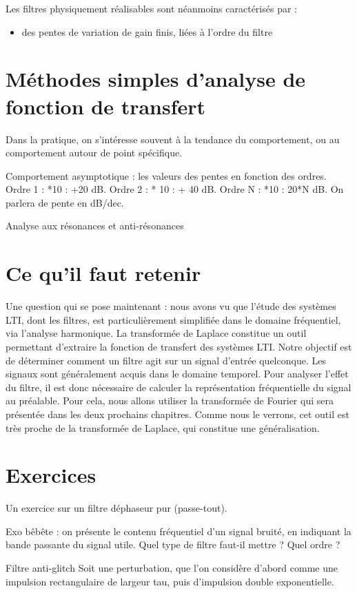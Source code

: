 \documentclass[]{report}
\begin{document}
	
	Les filtres physiquement réalisables sont néanmoins caractérisés par :
	\begin{itemize}
		\item des pentes de variation de gain finis, liées à l'ordre du filtre
	\end{itemize}
	
	
	\section{Méthodes simples d'analyse de fonction de transfert}
	Dans la pratique, on s'intéresse souvent à la tendance du comportement, ou au comportement autour de point spécifique.
	
	Comportement asymptotique : les valeurs des pentes en fonction des ordres. Ordre 1 : *10 : +20 dB. Ordre 2 : * 10 : + 40 dB. Ordre N : *10 : 20*N dB. On parlera de pente en dB/dec.
	
	Analyse aux résonances et anti-résonances
	
	
	\section{Ce qu'il faut retenir}
	Une question qui se pose maintenant : nous avons vu que l'étude des systèmes LTI, dont les filtres, est particulièrement simplifiée dans le domaine fréquentiel, via l'analyse harmonique. La transformée de Laplace constitue un outil permettant d'extraire la fonction de transfert des systèmes LTI.
	Notre objectif est de déterminer comment un filtre agit sur un signal d'entrée quelconque. Les signaux sont généralement acquis dans le domaine temporel. Pour analyser l'effet du filtre, il est donc nécessaire de calculer la représentation fréquentielle du signal au préalable. Pour cela, nous allons utiliser la transformée de Fourier qui sera présentée dans les deux prochains chapitres. Comme nous le verrons, cet outil est très proche de la transformée de Laplace, qui constitue une généralisation. 
	
	
	\section{Exercices }
	Un exercice sur un filtre déphaseur pur (passe-tout). 
	
	
	Exo bêbête : on présente le contenu fréquentiel d'un signal bruité, en indiquant la bande passante du signal utile. Quel type de filtre faut-il mettre ? Quel ordre ?
	
	Filtre anti-glitch
	Soit une perturbation, que l'on considère d'abord comme une impulsion rectangulaire de largeur tau, puis d'impulsion double exponentielle.
	
\end{document}
